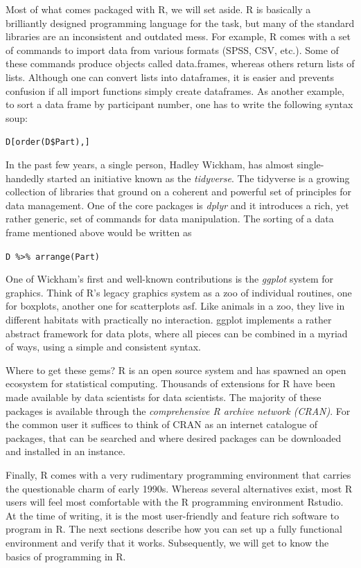\documentclass[]{svmono}
\theoremstyle{definition}
\theoremstyle{definition}
\theoremstyle{definition}
\theoremstyle{remark}
\begin{document}
Most of what comes packaged with R, we will set aside. R is basically a
brilliantly designed programming language for the task, but many of the
standard libraries are an inconsistent and outdated mess. For example, R
comes with a set of commands to import data from various formats (SPSS,
CSV, etc.). Some of these commands produce objects called data.frames,
whereas others return lists of lists. Although one can convert lists
into dataframes, it is easier and prevents confusion if all import
functions simply create dataframes. As another example, to sort a data
frame by participant number, one has to write the following syntax soup:

\texttt{D{[}order(D\$Part),{]}}

In the past few years, a single person, Hadley Wickham, has almost
single-handedly started an initiative known as the \emph{tidyverse}. The
tidyverse is a growing collection of libraries that ground on a coherent
and powerful set of principles for data management. One of the core
packages is \emph{dplyr} and it introduces a rich, yet rather generic,
set of commands for data manipulation. The sorting of a data frame
mentioned above would be written as

\texttt{D\ \%\textgreater{}\%\ arrange(Part)}

One of Wickham's first and well-known contributions is the \emph{ggplot}
system for graphics. Think of R's legacy graphics system as a zoo of
individual routines, one for boxplots, another one for scatterplots asf.
Like animals in a zoo, they live in different habitats with practically
no interaction. ggplot implements a rather abstract framework for data
plots, where all pieces can be combined in a myriad of ways, using a
simple and consistent syntax.

Where to get these gems? R is an open source system and has spawned an
open ecosystem for statistical computing. Thousands of extensions for R
have been made available by data scientists for data scientists. The
majority of these packages is available through the \emph{comprehensive
R archive network (CRAN)}. For the common user it suffices to think of
CRAN as an internet catalogue of packages, that can be searched and
where desired packages can be downloaded and installed in an instance.

Finally, R comes with a very rudimentary programming environment that
carries the questionable charm of early 1990s. Whereas several
alternatives exist, most R users will feel most comfortable with the R
programming environment Rstudio. At the time of writing, it is the most
user-friendly and feature rich software to program in R. The next
sections describe how you can set up a fully functional environment and
verify that it works. Subsequently, we will get to know the basics of
programming in R.
\end{document}
